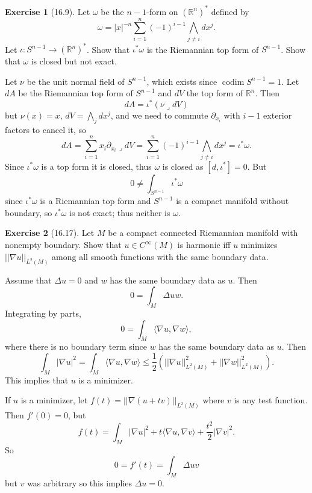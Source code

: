 \documentclass[10pt]{article}
\newcommand{\RR}{\mathbb{R}}
\newcommand{\iprod}{\mathbin{\lrcorner}}
\DeclareMathOperator{\codim}{codim}
\theoremstyle{definition}
\newtheorem{exer}{Exercise}
\begin{document}
\begin{exer}[16.9]
Let $\omega$ be the $n-1$-form on $(\RR^n)^*$ defined by
$$\omega = |x|^{-n} \sum_{i=1}^n (-1)^{i-1} \bigwedge_{j \neq i} dx^j.$$
Let $\iota: S^{n-1} \to (\RR^n)^*$.
Show that $\iota^*\omega$ is the Riemannian top form of $S^{n-1}$.
Show that $\omega$ is closed but not exact.
\end{exer}

Let $\nu$ be the unit normal field of $S^{n-1}$, which exists since $\codim S^{n-1} = 1$.
Let $dA$ be the Riemannian top form of $S^{n-1}$ and $dV$ the top form of $\RR^n$. Then
$$dA = \iota^*(\nu \iprod dV)$$
but $\nu(x) = x$, $dV = \bigwedge_j dx^j$, and we need to commute $\partial_{x_i}$ with $i-1$ exterior factors to cancel it, so
$$dA = \sum_{i=1}^n x_i \partial_{x_i} \iprod dV = \sum_{i=1}^n (-1)^{i-1} \bigwedge_{j \neq i} dx^j = \iota^*\omega.$$
Since $\iota^*\omega$ is a top form it is closed, thus $\omega$ is closed as $[d, \iota^*] = 0$.
But
$$0 \neq \int_{S^{n-1}} \iota^*\omega$$
since $\iota^*\omega$ is a Riemannian top form and $S^{n-1}$ is a compact manifold without boundary, so $\iota^*\omega$ is not exact; thus neither is $\omega$.

\begin{exer}[16.17]
Let $M$ be a compact connected Riemannian manifold with nonempty boundary.
Show that $u \in C^\infty(M)$ is harmonic iff $u$ minimizes $||\nabla u||_{L^2(M)}$ among all smooth functions with the same boundary data.
\end{exer}

Assume that $\Delta u = 0$ and $w$ has the same boundary data as $u$. Then
$$0 = \int_M \Delta uw.$$
Integrating by parts,
$$0 = \int_M \langle \nabla u, \nabla w\rangle,$$
where there is no boundary term since $w$ has the same boundary data as $u$.
Then
$$\int_M |\nabla u|^2 = \int_M \langle \nabla u, \nabla w\rangle \leq \frac{1}{2}(||\nabla u||_{L^2(M)}^2 + ||\nabla w||_{L^2(M)}^2).$$
This implies that $u$ is a minimizer.

If $u$ is a minimizer, let $f(t) = ||\nabla(u + tv)||_{L^2(M)}$ where $v$ is any test function. Then $f'(0) = 0$, but
$$f(t) = \int_M |\nabla u|^2 + t\langle \nabla u, \nabla v\rangle + \frac{t^2}{2}|\nabla v|^2.$$
So
$$0 = f'(t) = \int_M \Delta uv$$
but $v$ was arbitrary so this implies $\Delta u = 0$.
\end{document}
